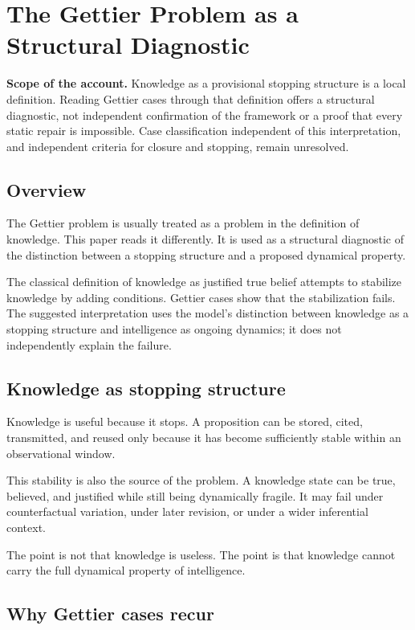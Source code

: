 \section{The Gettier Problem as a Structural Diagnostic}

\noindent\textbf{Scope of the account.} Knowledge as a provisional stopping structure is a local definition. Reading Gettier cases through that definition offers a structural diagnostic, not independent confirmation of the framework or a proof that every static repair is impossible. Case classification independent of this interpretation, and independent criteria for closure and stopping, remain unresolved.


\subsection{Overview}

The Gettier problem is usually treated as a problem in the definition of knowledge. This paper reads it differently. It is used as a structural diagnostic of the distinction between a stopping structure and a proposed dynamical property.

The classical definition of knowledge as justified true belief attempts to stabilize knowledge by adding conditions. Gettier cases show that the stabilization fails. The suggested interpretation uses the model's distinction between knowledge as a stopping structure and intelligence as ongoing dynamics; it does not independently explain the failure.

\subsection{Knowledge as stopping structure}

Knowledge is useful because it stops. A proposition can be stored, cited, transmitted, and reused only because it has become sufficiently stable within an observational window.

This stability is also the source of the problem. A knowledge state can be true, believed, and justified while still being dynamically fragile. It may fail under counterfactual variation, under later revision, or under a wider inferential context.

The point is not that knowledge is useless. The point is that knowledge cannot carry the full dynamical property of intelligence.

\subsection{Why Gettier cases recur}

